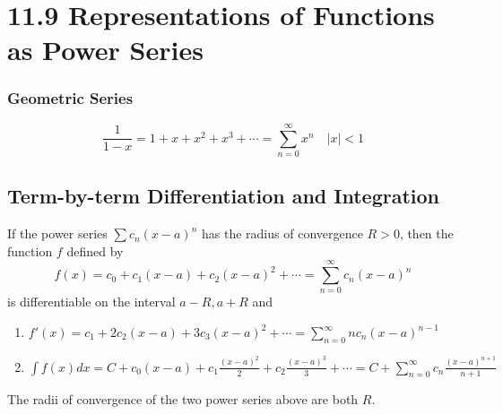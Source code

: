 %
%

\section*{11.9 Representations of Functions as Power Series}

\subsubsection*{Geometric Series}

\[ \frac{1}{1-x} = 1 + x + x^2 + x^3 + \cdots = \sum_{n=0}^{\infty}{x^n} \quad
|x| < 1\]

\subsection*{Term-by-term Differentiation and Integration}

If the power series \(\sum{c_n(x-a)^n}\) has the radius of convergence \(R
> 0\), then the function \(f\) defined by
\[f(x) = c_0 + c_1(x-a) + c_2(x-a)^2 + \cdots
= \sum_{n=0}^{\infty}{c_n(x-a)^n}\]
is differentiable on the interval \(a-R, a+R\) and
\begin{enumerate}
    \item \(f'(x) = c_1 + 2c_2(x-a) + 3c_3(x-a)^2 + \cdots
= \sum_{n=0}^{\infty}{nc_n(x-a)^{n-1}}\)
    \item \( \int{f(x)dx} = C + c_0(x-a) + c_1 \frac{(x-a)^2}{2} + c_2
\frac{(x-a)^3}{3} + \cdots = C + \sum_{n=0}^{\infty}{c_n
\frac{(x-a)^{n+1}}{n+1}} \)
\end{enumerate}
The radii of convergence of the two power series above are both \(R\).
